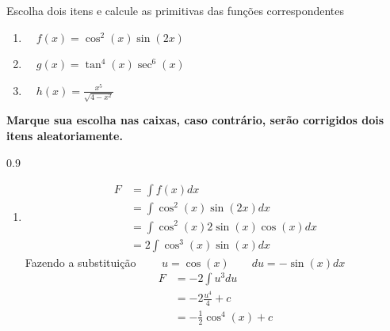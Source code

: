 \documentclass[a4paper,12pt,fleqn]{article}
\newenvironment{resposta}%
  {\begingroup\color{blue}\small\begin{spacing}{0.9}}%
  {\end{spacing}\endgroup}
\begin{document}
\vspace{\baselineskip}
Escolha dois itens e calcule as primitivas das funções correspondentes
\begin{enumerate}[label=\alph*) \raisebox{-2mm}{\huge\(\square\)}]
  \setlength\itemsep{1em}
  \item \(\quad f(x) = \cos^2(x)\sin(2x)  \)
  \item \(\quad g(x) = \tan^4(x)\sec^6(x) \)
  \item \(\quad h(x) = \frac{x^5}{\sqrt{4-x^2}}  \)
\end{enumerate}
\textbf{Marque sua escolha nas caixas,
  caso contrário, serão corrigidos dois itens aleatoriamente.}

\begin{resposta}
  \begin{enumerate}[label=\alph*)]

    \item
      \begin{align*}
        F
        & = \int f(x) dx \\
        & = \int \cos^2(x)\sin(2x) dx \\
        & = \int \cos^2(x)2\sin(x)\cos(x) dx \\
        & = 2\int \cos^3(x)\sin(x) dx
      \end{align*}
      Fazendo a substituição
      \(
        \qquad
        u = \cos(x)
        \qquad
        du = -\sin(x)dx
      \)
      \begin{align*}
        F
        & = -2\int u^3 du \\
        & = -2 \frac{u^4}{4} + c \\
        & = -\frac{1}{2}\cos^4(x) + c
      \end{align*}


\end{enumerate}
\end{resposta}
\end{document}
